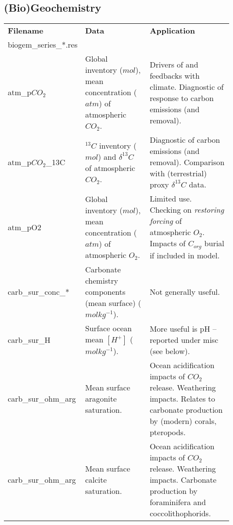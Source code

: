 \documentclass[11pt,fleqn]{book} %
\begin{document}
%
\clearpage
\subsection{(Bio)Geochemistry}

\begin{table}[ht]
\begin{tabular}{p{0.2\linewidth} p{0.317\linewidth} p{0.4\linewidth}}
\toprule
\textbf{Filename} & \textbf{Data} & \textbf{Application}\\
\textsf{\footnotesize biogem\_series\_*.res} & &\\
\midrule

\textsf{\footnotesize atm\_p\(CO_{2}\)} & \small{Global inventory (\(mol\)), mean concentration (\(atm\)) of atmospheric \(CO_{2}\). } & \small{Drivers of and feedbacks with climate. Diagnostic of response to carbon emissions (and removal).}\\
\textsf{\footnotesize atm\_p\(CO_{2}\)\_13C} & \small{\(^{13}C\) inventory (\(mol\)) and \(\delta^{13}C\) of atmospheric \(CO_{2}\).} & \small{Diagnostic of carbon emissions (and removal). Comparison with (terrestrial) proxy \(\delta^{13}C\) data.}\\
\textsf{\footnotesize atm\_pO2} & \small{Global inventory (\(mol\)), mean concentration (\(atm\)) of atmospheric \(O_{2}\). } & \small{ Limited use. Checking on \textit{restoring forcing} of atmospheric \(O_{2}\). Impacts of \(C_{org}\) burial if included in model.}\\

\midrule

\textsf{\footnotesize carb\_sur\_conc\_*} & \small{Carbonate chemistry components (mean surface) (\(molkg^{-1}\)).} & \small{Not generally useful. }\\
\textsf{\footnotesize carb\_sur\_H} & \small{Surface ocean mean \([H^{+}]\) (\(molkg^{-1}\)).} & \small{More useful is pH -- reported under \textsf{\footnotesize misc} (see below). }\\
\textsf{\footnotesize carb\_sur\_ohm\_arg} & \small{Mean surface aragonite saturation.} & \small{Ocean acidification impacts of \(CO_{2}\) release. Weathering impacts. Relates to carbonate production by (modern) corals, pteropods.}\\
\textsf{\footnotesize carb\_sur\_ohm\_arg} & \small{Mean surface calcite saturation.} & \small{Ocean acidification impacts of \(CO_{2}\) release. Weathering impacts. Carbonate production by foraminifera and coccolithophorids.}\\


\end{tabular}
\end{table}
\end{document}

